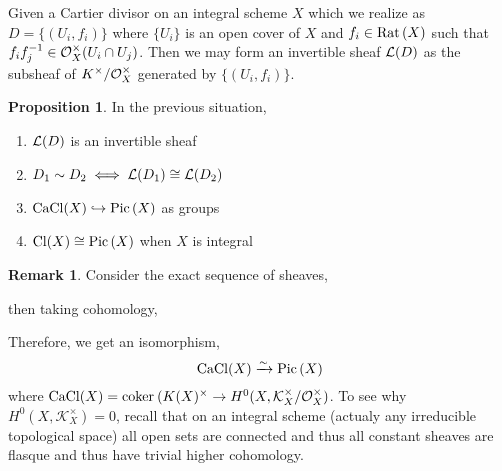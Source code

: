 \documentclass[12pt]{extarticle}
\newcommand{\coker}[1]{\mathrm{coker}\: #1}
\theoremstyle{definition}
\newtheorem{proposition}[theorem]{Proposition}
\newtheorem{remark}{Remark}
\begin{document}
\newcommand{\K}{\mathcal{K}}

Given a Cartier divisor on an integral scheme $X$ which we realize as $D = \{ (U_i, f_i) \}$ where $\{ U_i \}$ is an open cover of $X$ and $f_i \in \mathrm{Rat} \left( X \right)$ such that $f_i f_j^{-1} \in \mathcal{O}_{X}^\times(U_i \cap U_j)$. Then we may form an invertible sheaf $\mathcal{L}(D)$ as the subsheaf of $K^\times / \mathcal{O}_{X}^\times$ generated by $\{ (U_i, f_i) \}$. 
\begin{proposition}
In the previous situation,
\begin{enumerate}
\item $\mathcal{L}(D)$ is an invertible sheaf
\item $D_1 \sim D_2 \iff \mathcal{L}(D_1) \cong \mathcal{L}(D_2)$
\item $\mathrm{CaCl}(X) \hookrightarrow \mathrm{Pic}\left( X \right)$ as groups
\item $\mathrm{Cl}(X) \cong \mathrm{Pic}\left( X \right)$ when $X$ is integral 
\end{enumerate}
\end{proposition}

\begin{remark}
Consider the exact sequence of sheaves,
\begin{center}
\end{center}
then taking cohomology,
\begin{center}
\end{center}
Therefore, we get an isomorphism,
\[ \mathrm{CaCl}(X) \xrightarrow{\sim} \mathrm{Pic}\left( X \right) \]
where $\mathrm{CaCl}(X) = \coker{(K(X)^\times \to H^0(X, \K_X^\times / \struct{X}^\times)}$. To see why $H^0(X, \K_X^\times) = 0$,
recall that on an integral scheme (actualy any irreducible topological space) all open sets are connected and thus all constant sheaves are flasque and thus have trivial higher cohomology. 
\end{remark}
\end{document}
